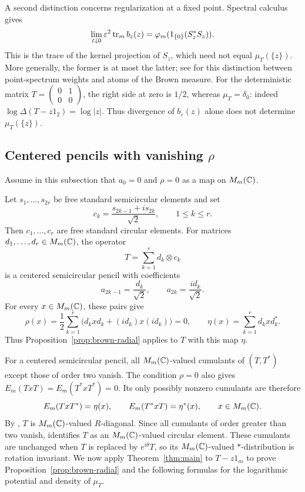 A second distinction concerns regularization at a fixed point.
Spectral calculus gives
\begin{equation}\label{eq:brown-kernel-limit}
 \lim_{\varepsilon\downarrow0}\varepsilon^2
               \operatorname{tr}_m b_\varepsilon(z)
   =\varphi_m(1_{\{0\}}(S_z^*S_z)).
\end{equation}
This is the trace of the kernel projection of $S_z$, which need not equal $\mu_T(\{z\})$.
More generally, the former is at most the latter; see \cite[Section~2.1, p.~12]{ACSY24} for this distinction between point-spectrum weights and atoms of the Brown measure.
For the deterministic matrix $T=\left(\begin{smallmatrix}0&1\\0&0\end{smallmatrix}\right)$, the right side at zero is $1/2$, whereas $\mu_T=\delta_0$: indeed $\log\Delta(T-z1_2)=\log|z|$.
Thus divergence of $b_\varepsilon(z)$ alone does not determine $\mu_T(\{z\})$.

\subsection{Centered pencils with vanishing \texorpdfstring{$\rho$}{rho}}
\label{subsec:brown-radial}
Assume in this subsection that $a_0=0$ and $\rho=0$ as a map on $M_m(\mathbb C)$.

\begin{example}
\label{ex:brown-circular-coefficients}
Let $s_1,\ldots,s_{2r}$ be free standard semicircular elements and set
\[
 c_k=\frac{s_{2k-1}+is_{2k}}{\sqrt2},\qquad 1\le k\le r.
\]
Then $c_1,\ldots,c_r$ are free standard circular elements.
For matrices $d_1,\ldots,d_r\in M_m(\mathbb C)$, the operator
\[
 T=\sum_{k=1}^r d_k\otimes c_k
\]
is a centered semicircular pencil with coefficients
\[
 a_{2k-1}=\frac{d_k}{\sqrt2},\qquad
 a_{2k}=\frac{id_k}{\sqrt2}.
\]
For every $x\in M_m(\mathbb C)$, these pairs give
\[
 \rho(x)=\frac12\sum_{k=1}^r
           \bigl(d_kxd_k+(id_k)x(id_k)\bigr)=0,
 \qquad
 \eta(x)=\sum_{k=1}^r d_kxd_k^*.
\]
Thus Proposition~\ref{prop:brown-radial} applies to $T$ with this map $\eta$.
\end{example}

For a centered semicircular pencil, all $M_m(\mathbb C)$-valued cumulants of $(T,T^*)$ except those of order two vanish.
The condition $\rho=0$ also gives $E_m(TxT)=E_m(T^*xT^*)=0$.
Its only possibly nonzero cumulants are therefore
\[
 E_m(TxT^*)=\eta(x),\qquad E_m(T^*xT)=\eta^*(x),
 \qquad x\in M_m(\mathbb C).
\]
By \cite[Theorem 2.9(b)]{DG24}, $T$ is $M_m(\mathbb C)$-valued $R$-diagonal.
Since all cumulants of order greater than two vanish, \cite[Definition 2.10]{DG24} identifies $T$ as an $M_m(\mathbb C)$-valued circular element.
These cumulants are unchanged when $T$ is replaced by $e^{i\theta}T$, so its $M_m(\mathbb C)$-valued $*$-distribution is rotation invariant.
We now apply Theorem~\ref{thm:main} to $T-z1_m$ to prove Proposition~\ref{prop:brown-radial} and the following formulas for the logarithmic potential and density of $\mu_T$.

